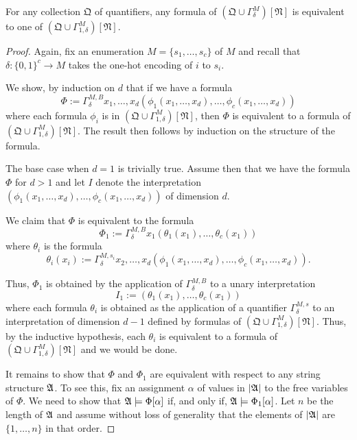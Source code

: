 \documentclass[a4paper,UKenglish,cleveref, autoref, thm-restate, anonymous]{lipics-v2021}
\begin{document}
  \begin{lemma}\label{lem:nesting}
    For any collection $\mathfrak{Q}$ of quantifiers, any formula of $(\mathfrak{Q}  \cup \Gamma^{M}_{\delta})[\mathfrak{N}]$ is equivalent to one of $(\mathfrak{Q}  \cup \Gamma^{M}_{1,\delta})[\mathfrak{N}]$.
  \end{lemma}
  \begin{proof}
Again, fix an enumeration $M = \{s_1,\ldots,s_c\}$ of $M$ and recall that $\delta : \{0,1\}^c \rightarrow M$ takes the one-hot encoding of $i$ to $s_i$.
    
    We show, by induction on $d$ that if we have a formula
    \[ \Phi := \Gamma^{M,B}_{\delta} x_1,\ldots,x_d (\phi_1(x_1,\ldots,x_d),\ldots,\phi_c(x_1,\ldots,x_d)) \]
 where each formula $\phi_i$ is in $(\mathfrak{Q}  \cup \Gamma^{M}_{1,\delta})[\mathfrak{N}]$, then $\Phi$  is equivalent to a formula of $(\mathfrak{Q}  \cup \Gamma^{M}_{1,\delta})[\mathfrak{N}]$.  The result then follows by induction on the structure of the formula.

    The base case when $d=1$ is trivially true.  Assume then that we have the formula $\Phi$ for $d > 1$ and let $I$ denote the interpretation $(\phi_1(x_1,\ldots,x_d),\ldots,\phi_c(x_1,\ldots,x_d))$ of dimension $d$.

    We claim that $\Phi$ is equivalent to the formula
    \[ \Phi_1 := \Gamma_{\delta}^{M,B} x_1  (\theta_1(x_1),\ldots,\theta_c(x_1)) \]
    where $\theta_i$ is the formula
    \[ \theta_i(x_i) := \Gamma_{\delta}^{M,s_i}x_2,\ldots,x_d (\phi_1(x_1,\ldots,x_d),\ldots,\phi_c(x_1,\ldots,x_d)).\]

    Thus, $\Phi_1$ is obtained by the application of $ \Gamma_{\delta}^{M,B}$ to a unary interpretation $$I_1 := (\theta_1(x_1),\ldots,\theta_c(x_1))$$ where each formula $\theta_i$ is obtained as the application of a quantifier $ \Gamma_{\delta}^{M,s}$ to an interpretation of dimension $d-1$ defined by formulas of $(\mathfrak{Q} \cup \Gamma^{M}_{1,\delta})[\mathfrak{N}]$.  Thus, by the inductive hypothesis, each $\theta_i$ is equivalent to a formula of $(\mathfrak{Q}  \cup \Gamma^{M}_{1,\delta})[\mathfrak{N}]$ and we would be done.

      It remains to show that $\Phi$ and $\Phi_1$ are equivalent with respect to any string structure $\mathfrak{A}$.  To see this, fix an assignment $\alpha$ of values in $|\mathfrak{A}|$ to the free variables of $\Phi$.  We need to show that $\mathfrak{A} \models \Phi[\alpha]$ if, and only if, $\mathfrak{A} \models \Phi_1[\alpha]$.  Let $n$ be the length of $\mathfrak{A}$ and assume without loss of generality that the elements of $|\mathfrak{A}|$ are $\{1,\ldots,n\}$ in that order.


\end{proof}
\end{document}
